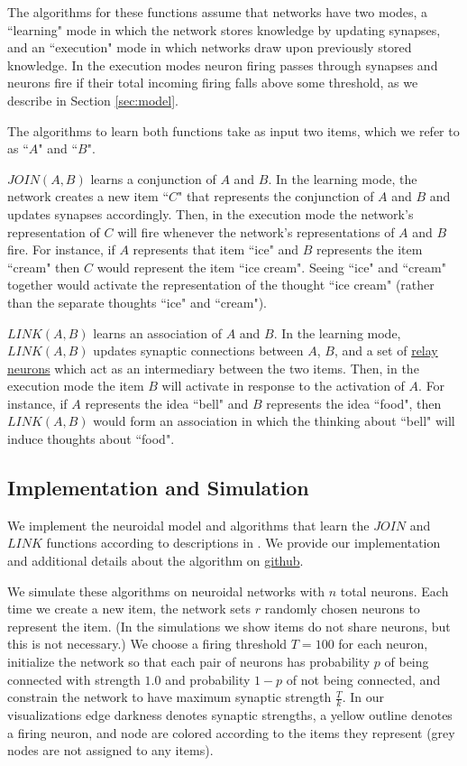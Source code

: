 \documentclass[letterpaper, 12pt]{article}
\begin{document}
The algorithms for these functions assume that networks have two modes, a ``learning" mode in which the network stores knowledge by updating synapses, and an ``execution" mode in which networks draw upon previously stored knowledge. In the execution modes neuron firing passes through synapses and neurons fire if their total incoming firing falls above some threshold, as we describe in Section \ref{sec:model}.

The algorithms to learn both functions take as input two items, which we refer to as ``$A$" and ``$B$".

$JOIN(A,B)$ learns a conjunction of $A$ and $B$. In the learning mode, the network creates a new item ``$C$" that represents the conjunction of $A$ and $B$ and updates synapses accordingly. Then, in the execution mode the network's representation of $C$ will fire whenever the network's representations of $A$ and $B$ fire. For instance, if $A$ represents that item ``ice" and $B$ represents the item ``cream" then $C$ would represent the item ``ice cream". Seeing ``ice" and ``cream" together would activate the representation of the thought ``ice cream" (rather than the separate thoughts ``ice" and ``cream").

$LINK(A,B)$ learns an association of $A$ and $B$. In the learning mode, $LINK(A,B)$ updates synaptic connections between $A$, $B$, and a set of \underline{relay neurons} which act as an intermediary between the two items. Then, in the execution mode the item $B$ will activate in response to the activation of $A$. For instance, if $A$ represents the idea ``bell" and $B$ represents the idea ``food", then $LINK(A,B)$ would form an association in which the thinking about ``bell" will induce thoughts about ``food".

\subsection{Implementation and Simulation}
We implement the neuroidal model and algorithms that learn the $JOIN$ and $LINK$ functions according to descriptions in \cite{valiant_memorization_2005}. We provide our implementation and additional details about the algorithm on \href{https://github.com/cchen23/neuroidal_model_project/tree/master/Code}{github}.

We simulate these algorithms on neuroidal networks with $n$ total neurons. Each time we create a new item, the network sets $r$ randomly chosen neurons to represent the item. (In the simulations we show items do not share neurons, but this is not necessary.) We choose a firing threshold $T=100$ for each neuron, initialize the network so that each pair of neurons has probability $p$ of being connected with strength $1.0$ and probability $1-p$ of not being connected, and constrain the network to have maximum synaptic strength $\frac{T}{k}$. In our visualizations edge darkness denotes synaptic strengths, a yellow outline denotes a firing neuron, and node are colored according to the items they represent (grey nodes are not assigned to any items).
\end{document}
